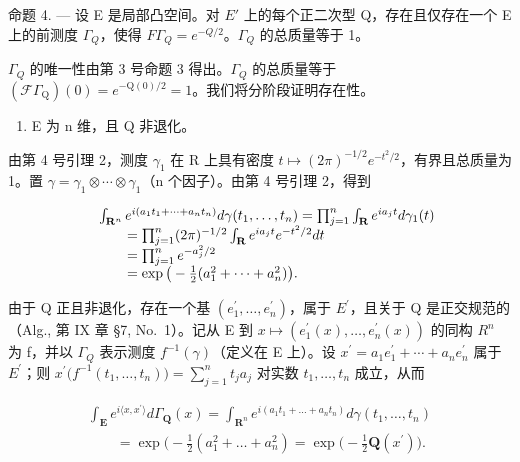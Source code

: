 命题 4. --- 设 E 是局部凸空间。对 \(E'\) 上的每个正二次型 Q，存在且仅存在一个 E 上的前测度 \(\Gamma_{Q}\)，使得 \(F\Gamma_{Q}=e^{-Q/2}\)。\(\Gamma_{Q}\) 的总质量等于 1。

\(\Gamma_{Q}\) 的唯一性由第 3 号命题 3 得出。\(\Gamma_{Q}\) 的总质量等于 \((\mathcal{F}\Gamma_{\mathrm{Q}})(0)=e^{-\mathrm{Q}(0)/2}=1\)。我们将分阶段证明存在性。

\begin{enumerate}
\def\labelenumi{\Alph{enumi})}
\tightlist
\item
  E 为 n 维，且 Q 非退化。
\end{enumerate}

由第 4 号引理 2，测度 \(\gamma_{1}\) 在 R 上具有密度 \(t \mapsto (2\pi)^{-1/2}e^{-t^{2}/2}\)，有界且总质量为 1。置 \(\gamma = \gamma_{1} \otimes \cdots \otimes \gamma_{1}\)（n 个因子）。由第 4 号引理 2，得到

\[
\begin{array}{r l} & {\int_ {\mathbf {R} ^ {n}} e ^ {i (a _ {1} t _ {1} + \dots + a _ {n} t _ {n})} d \gamma (t _ {1}, \ldots , t _ {n}) = \prod_ {j = 1} ^ {n} \int_ {\mathbf {R}} e ^ {i a _ {j} t} d \gamma_ {1} (t)} \\ & {\qquad = \prod_ {j = 1} ^ {n} (2 \pi) ^ {- 1 / 2} \int_ {\mathbf {R}} e ^ {i a _ {j} t} e ^ {- t ^ {2} / 2} d t} \\ & {\qquad = \prod_ {j = 1} ^ {n} e ^ {- a _ {j} ^ {2} / 2}} \\ & {\qquad = \exp \big (- \frac {1}{2} (a _ {1} ^ {2} + \dots + a _ {n} ^ {2}) \big).} \end{array}
\]

由于 Q 正且非退化，存在一个基 \((e_{1}^{\prime},\ldots,e_{n}^{\prime})\)，属于 \(E^{\prime}\)，且关于 Q 是正交规范的（Alg., 第 IX 章 §7, No.~1）。记从 E 到 \(x\mapsto(e_{1}^{\prime}(x),\ldots,e_{n}^{\prime}(x))\) 的同构 \(R^{n}\) 为 f，并以 \(\Gamma_{Q}\) 表示测度 \(f^{-1}(\gamma)\)（定义在 E 上）。设 \(x^{\prime}=a_{1}e_{1}^{\prime}+\cdots+a_{n}e_{n}^{\prime}\) 属于 \(E^{\prime}\)；则 \(x^{\prime}\big(f^{-1}(t_{1},\ldots,t_{n})\big)=\sum_{j=1}^{n}t_{j}a_{j}\) 对实数 \(t_{1},\ldots,t_{n}\) 成立，从而

\[
\begin{array}{l} \int_ {\mathbf {E}} e ^ {i \langle x, x ^ {\prime} \rangle} d \Gamma_ {\mathbf {Q}} (x) = \int_ {\mathbf {R} ^ {n}} e ^ {i (a _ {1} t _ {1} + \dots + a _ {n} t _ {n})} d \gamma (t _ {1}, \ldots , t _ {n}) \\ \qquad = \exp \big (- \frac {1}{2} (a _ {1} ^ {2} + \dots + a _ {n} ^ {2}) = \exp \big (- \frac {1}{2} \mathbf {Q} (x ^ {\prime}) \big). \end{array}
\]

